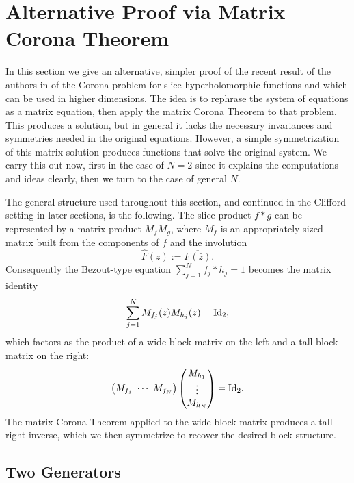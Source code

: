 \documentclass[11pt]{amsart}
\begin{document}
\section{Alternative Proof via Matrix Corona Theorem}
\label{s:simpleproof}

In this section we give an alternative, simpler proof of the recent result of the authors in \cite{CPSW} of the Corona problem for slice hyperholomorphic functions and which can be used in higher dimensions.  The idea is to rephrase the system of equations as a matrix equation, then apply the matrix Corona Theorem to that problem.  This produces a solution, but in general it lacks the necessary invariances and symmetries needed in the original equations.  However, a simple symmetrization of this matrix solution produces functions that solve the original system.  We carry this out now, first in the case of $N=2$ since it explains the computations and ideas clearly, then we turn to the case of general $N$.

The general structure used throughout this section, and continued in the Clifford setting in later sections, is the following.  The slice product $f*g$ can be represented by a matrix product $M_f M_g$, where $M_f$ is an appropriately sized matrix built from the components of $f$ and the involution
\[
\hat F(z) := \overline{F(\bar z)}.
\]
Consequently the Bezout-type equation $\displaystyle\sum_{j=1}^{N} f_j * h_j = 1$ becomes the matrix identity
\[
\sum_{j=1}^N M_{f_j}(z) M_{h_j}(z) = \textnormal{Id}_2,
\]
which factors as the product of a wide block matrix on the left and a tall block matrix on the right:
\[
\bigl(M_{f_1}\ \cdots\ M_{f_N}\bigr) \begin{pmatrix} M_{h_1} \\ \vdots \\ M_{h_N} \end{pmatrix} = \textnormal{Id}_2.
\]
The matrix Corona Theorem applied to the wide block matrix produces a tall right inverse, which we then symmetrize to recover the desired block structure.

\subsection{Two Generators}
\end{document}
